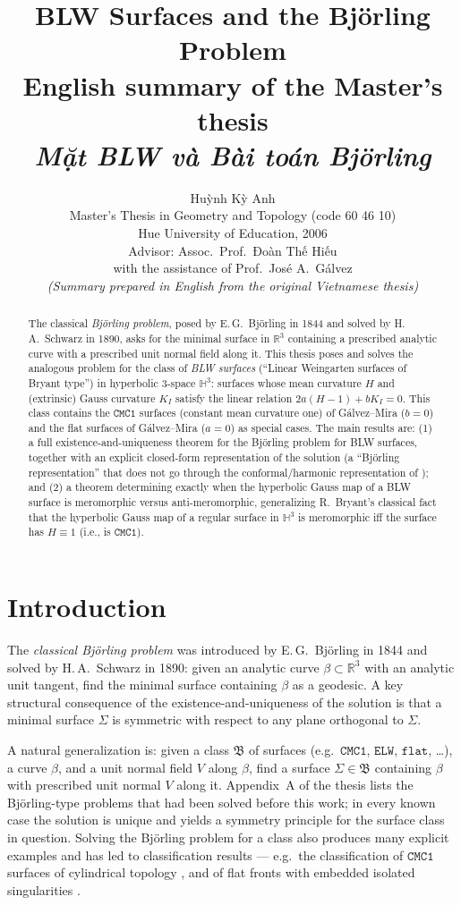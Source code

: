 \documentclass[11pt,a4paper]{article}
\title{\textbf{BLW Surfaces and the Björling Problem}\\[2mm]
\large English summary of the Master's thesis\\
\textit{Mặt BLW và Bài toán Björling}}
\author{Huỳnh Kỳ Anh\\[1mm]
\small Master's Thesis in Geometry and Topology (code 60 46 10)\\
\small Hue University of Education, 2006\\
\small Advisor: Assoc.\ Prof.\ Đoàn Thế Hiếu\\
\small with the assistance of Prof.\ José A.\ Gálvez\\[3mm]
\small \emph{(Summary prepared in English from the original Vietnamese thesis)}}
\date{}
\newcommand{\RR}{\mathbb{R}}
\newcommand{\Hyp}{\mathbb{H}^3}                      %
\theoremstyle{plain}
\theoremstyle{definition}
\theoremstyle{remark}
\begin{document}
\maketitle

\begin{abstract}
The classical \emph{Björling problem}, posed by E.\,G.\ Björling in 1844 and
solved by H.\,A.\ Schwarz in 1890, asks for the minimal surface in $\RR^3$
containing a prescribed analytic curve with a prescribed unit normal field
along it. This thesis poses and solves the analogous problem for the class
of \emph{BLW surfaces} (``Linear Weingarten surfaces of Bryant type'') in
hyperbolic $3$-space $\Hyp$: surfaces whose mean curvature $H$ and (extrinsic)
Gauss curvature $K_I$ satisfy the linear relation $2a(H-1)+bK_I=0$.
This class contains the $\mathtt{CMC1}$ surfaces (constant mean curvature
one) of Gálvez--Mira \cite{GMM1} ($b=0$) and the flat surfaces of
Gálvez--Mira \cite{GMM5} ($a=0$) as special cases. The main results are:
(1) a full existence-and-uniqueness theorem for the Björling problem for BLW
surfaces, together with an explicit closed-form representation of the
solution (a ``Björling representation'' that does not go through the
conformal/harmonic representation of \cite{GMM2}); and (2) a theorem
determining exactly when the hyperbolic Gauss map of a BLW surface is
meromorphic versus anti-meromorphic, generalizing R.\ Bryant's classical
fact that the hyperbolic Gauss map of a regular surface in $\Hyp$ is
meromorphic iff the surface has $H\equiv 1$ (i.e., is $\mathtt{CMC1}$).
\end{abstract}

\tableofcontents

\section{Introduction}

The \emph{classical Björling problem} was introduced by E.\,G.\ Björling in
1844 and solved by H.\,A.\ Schwarz in 1890: given an analytic curve
$\beta\subset\RR^3$ with an analytic unit tangent, find the minimal surface
containing $\beta$ as a geodesic. A key structural consequence of the
existence-and-uniqueness of the solution is that a minimal surface $\Sigma$
is symmetric with respect to any plane orthogonal to $\Sigma$.

A natural generalization is: given a class $\mathfrak B$ of surfaces
(e.g.\ $\mathtt{CMC1}$, $\mathtt{ELW}$, $\mathtt{flat}$, \dots), a curve
$\beta$, and a unit normal field $V$ along $\beta$, find a surface
$\Sigma\in\mathfrak B$ containing $\beta$ with prescribed unit normal $V$
along it. Appendix~A of the thesis lists the Björling-type problems that
had been solved before this work; in every known case the solution is
unique and yields a symmetry principle for the surface class in question.
Solving the Björling problem for a class also produces many explicit
examples and has led to classification results — e.g.\ the classification
of $\mathtt{CMC1}$ surfaces of cylindrical topology \cite{GMM1}, and of
flat fronts with embedded isolated singularities \cite{GMM5}.
\end{document}
